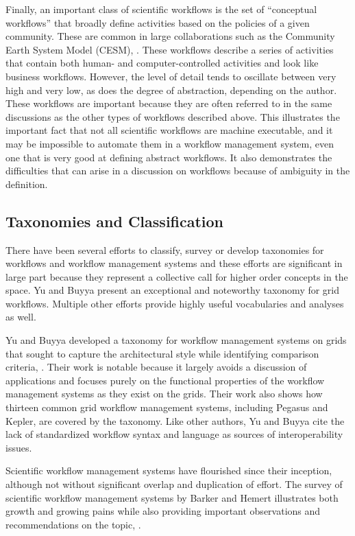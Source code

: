 Finally, an important class of scientific workflows is the set of ``conceptual
workflows'' that broadly define activities based on the policies of a given
community. These are common in large collaborations such as the Community Earth
System Model (CESM), \cite{noauthor_cesm_nodate}. These workflows describe a
series of activities that contain both human- and computer-controlled activities
and look like business workflows. However, the level of detail tends to
oscillate between very high and very low, as does the degree of abstraction,
depending on the author. These workflows are important because they are often
referred to in the same discussions as the other types of workflows described
above. This illustrates the important fact that not all scientific workflows are
machine executable, and it may be impossible to automate them in a workflow
management system, even one that is very good at defining abstract workflows. It
also demonstrates the difficulties that can arise in a discussion on workflows
because of ambiguity in the definition.

\subsection{Taxonomies and Classification}\label{taxonomies-and-classification}
There have been several efforts to classify, survey or develop taxonomies for
workflows and workflow management systems and these efforts are significant in
large part because they represent a collective call for higher order concepts in
the space. Yu and Buyya present an exceptional and noteworthy taxonomy for grid
workflows. Multiple other efforts provide highly useful vocabularies and
analyses as well.

Yu and Buyya developed a taxonomy for workflow management systems on grids that
sought to capture the architectural style while identifying comparison criteria,
\cite{yu_taxonomy_2005}. Their work is notable because it largely avoids a
discussion of applications and focuses purely on the functional properties of
the workflow management systems as they exist on the grids. Their work also
shows how thirteen common grid workflow management systems, including Pegasus
and Kepler, are covered by the taxonomy. Like other authors, Yu and Buyya cite
the lack of standardized workflow syntax and language as sources of
interoperability issues.

Scientific workflow management systems have flourished since their inception,
although not without significant overlap and duplication of effort. The survey
of scientific workflow management systems by Barker and Hemert illustrates both
growth and growing pains while also providing important observations and
recommendations on the topic, \cite{barker_scientific_2007}.

